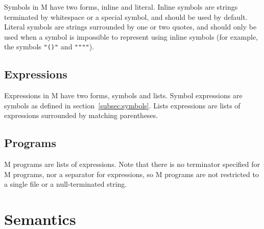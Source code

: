 \documentclass{article}
\newcommand{\comm}[1]{}
\begin{document}
\begin{multicols}{\comm{2}}
        \begin{minipage}{\columnwidth}
            Symbols in M have two forms, inline and literal.
            Inline symbols are strings terminated by whitespace or a special symbol, and should be used by default.
            Literal symbols are strings surrounded by one or two quotes, and should only be used when a symbol is impossible to represent using inline symbols (for example, the symbols \texttt{"()"} and \texttt{""""}).
        \end{minipage}

        \subsection{Expressions}\label{subsec:expressions}

        \begin{minipage}{\columnwidth}
            Expressions in M have two forms, symbols and lists.
            Symbol expressions are symbols as defined in section~\ref{subsec:symbols}.
            Lists expressions are lists of expressions surrounded by matching parentheses.
        \end{minipage}

        \subsection{Programs}\label{subsec:programs}

        \begin{minipage}{\columnwidth}
            M programs are lists of expressions.
            Note that there is no terminator specified for M programs, nor a separator for expressions, so M programs are not restricted to a single file or a null-terminated string.
        \end{minipage}
    \end{multicols}
    \newpage

    \section{Semantics}\label{sec:semantics}
\end{document}

